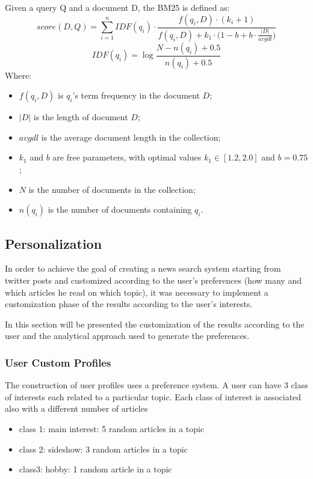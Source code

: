 \documentclass[11pt, english]{article}
\begin{document}
Given a query Q and a document D, the BM25 is defined as:
\begin{equation}
score(D, Q) = \sum_{i=1}^{n} IDF(q_i) \cdot \frac{f(q_i, D)\cdot(k_i + 1)}{f(q_i, D) + k_1 \cdot \bigg(1 - b + b \cdot \frac{|D|}{avgdl}\bigg)}
\end{equation}
\begin{equation}
IDF(q_i) = \log \frac{N - n(q_i) + 0.5}{n(q_i) + 0.5}
\end{equation}
Where:

\begin{itemize}[noitemsep]
\item $f(q_i, D)$ is $q_i$'s term frequency in the document $D$;
\item $|D|$ is the length of document $D$;
\item $avgdl$ is the average document length in the collection;
\item $k_1$ and $b$ are free parameters, with optimal values $k_1 \in [1.2, 2.0]$ and $b=0.75$;
\item $N$ is the number of documents in the collection;
\item $n(q_i)$  is the number of documents containing $q_i$. 
\end{itemize}

\subsection{Personalization}

In order to achieve the goal of creating a news search system starting from twitter posts and customized according to the user's preferences (how many and which articles he read on which topic), it was necessary to implement a customization phase of the results according to the user's interests.

In this section will be presented the customization of the results according to the user and the analytical approach used to generate the preferences.

\subsubsection{User Custom Profiles}

The construction of user profiles uses a preference system.
A user can have 3 class of interests each related to a particular topic. Each class of interest is associated also with a different number of articles

\begin{itemize}
\item class 1: main interest: 5 random articles in a topic
\item class 2: sideshow: 3 random articles in a topic
\item class3: hobby: 1 random article in a topic
\end{itemize}
\end{document}
